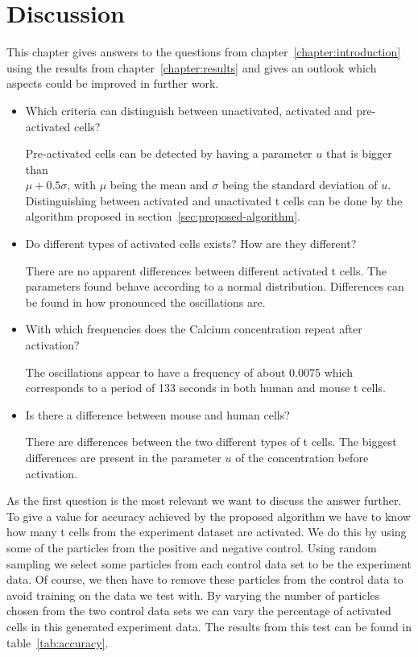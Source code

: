 \chapter{Discussion}
\label{chapter:conclusion}

This chapter gives answers to the questions from chapter~\ref{chapter:introduction} using the results from chapter~\ref{chapter:results} and gives an outlook which aspects could be improved in further work.

\begin{itemize}
	\item Which criteria can distinguish between unactivated, activated and pre-activated cells?
	
	Pre-activated cells can be detected by having a parameter $u$ that is bigger than\\ ${\mu + 0.5 \sigma}$, with $\mu$ being the mean and $\sigma$ being the standard deviation of $u$.\\ Distinguishing between activated and unactivated t cells can be done by the algorithm proposed in section~\ref{sec:proposed-algorithm}.
	\item Do different types of activated cells exists? How are they different?
	
	There are no apparent differences between different activated t cells. The parameters found behave according to a normal distribution. Differences can be found in how pronounced the oscillations are.
	\item With which frequencies does the Calcium concentration repeat after activation?
	
	The oscillations appear to have a frequency of about 0.0075 which corresponds to a period of 133 seconds in both human and mouse t cells.
	\item Is there a difference between mouse and human cells?
	
	There are differences between the two different types of t cells. The biggest differences are present in the parameter $u$ of the \Calcium concentration before activation.
\end{itemize}

As the first question is the most relevant we want to discuss the answer further. To give a value for accuracy achieved by the proposed algorithm we have to know how many t cells from the experiment dataset are activated. We do this by using some of the particles from the positive and negative control. Using random sampling we select some particles from each control data set to be the experiment data. Of course, we then have to remove these particles from the control data to avoid training on the data we test with. By varying the number of particles chosen from the two control data sets we can vary the percentage of activated cells in this generated experiment data. The results from this test can be found in table~\ref{tab:accuracy}.

